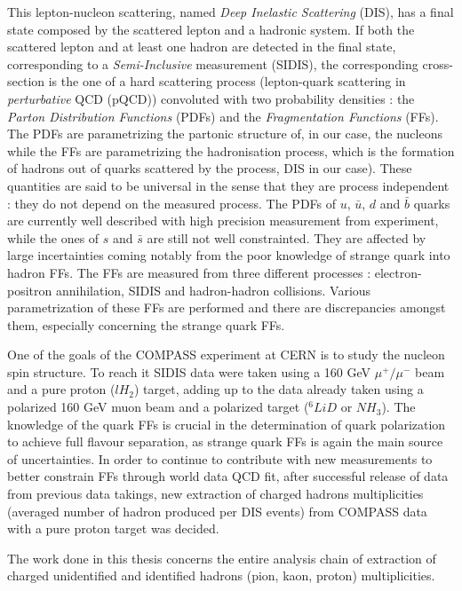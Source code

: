 This lepton-nucleon scattering, named \textit{Deep Inelastic Scattering} (DIS), has a final state composed by the scattered lepton and a hadronic system. If both the scattered lepton and at least one hadron are detected in the final state, corresponding to a \textit{Semi-Inclusive} measurement (SIDIS), the corresponding cross-section is the one of a hard scattering process (lepton-quark scattering in \textit{perturbative} QCD (pQCD)) convoluted with two probability densities : the \textit{Parton Distribution Functions} (PDFs) and the \textit{Fragmentation Functions} (FFs). The PDFs are parametrizing the partonic structure of, in our case, the nucleons while the FFs are parametrizing the hadronisation process, which is the formation of hadrons out of quarks scattered by the process, DIS in our case). These quantities are said to be universal in the sense that they are process independent : they do not depend on the measured process. The PDFs of $u$, $\bar{u}$, $d$ and $\bar{b}$ quarks are currently well described with high precision measurement from experiment, while the ones of $s$ and $\bar{s}$ are still not well constrainted. They are affected by large incertainties coming notably from the poor knowledge of strange quark into hadron FFs. The FFs are measured from three different processes : electron-positron annihilation, SIDIS and hadron-hadron collisions. Various parametrization of these FFs are performed and there are discrepancies amongst them, especially concerning the strange quark FFs.

One of the goals of the COMPASS experiment at CERN is to study the nucleon spin structure. To reach it SIDIS data were taken using a 160 GeV $\mu^+/\mu^-$ beam and a pure proton ($lH_2$) target, adding up to the data already taken using a polarized 160 GeV muon beam and a polarized target ($^6LiD$ or $NH_3$). The knowledge of the quark FFs is crucial in the determination of quark polarization to achieve full flavour separation, as strange quark FFs is again the main source of uncertainties. In order to continue to contribute with new measurements to better constrain FFs through world data QCD fit, after successful release of data from previous data takings, new extraction of charged hadrons multiplicities (averaged number of hadron produced per DIS events) from COMPASS data with a pure proton target was decided.

The work done in this thesis concerns the entire analysis chain of extraction of charged unidentified and identified hadrons (pion, kaon, proton) multiplicities.

